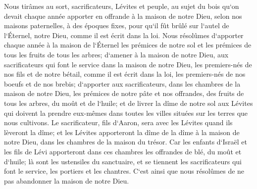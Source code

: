 \verse Nous tirâmes au sort, sacrificateurs, Lévites et peuple, au sujet du bois qu`on devait chaque année apporter en offrande à la maison de notre Dieu, selon nos maisons paternelles, à des époques fixes, pour qu`il fût brûlé sur l`autel de l`Éternel, notre Dieu, comme il est écrit dans la loi. 
\verse Nous résolûmes d`apporter chaque année à la maison de l`Éternel les prémices de notre sol et les prémices de tous les fruits de tous les arbres; 
\verse d`amener à la maison de notre Dieu, aux sacrificateurs qui font le service dans la maison de notre Dieu, les premiers-nés de nos fils et de notre bétail, comme il est écrit dans la loi, les premiers-nés de nos boeufs et de nos brebis; 
\verse d`apporter aux sacrificateurs, dans les chambres de la maison de notre Dieu, les prémices de notre pâte et nos offrandes, des fruits de tous les arbres, du moût et de l`huile; et de livrer la dîme de notre sol aux Lévites qui doivent la prendre eux-mêmes dans toutes les villes situées sur les terres que nous cultivons. 
\verse Le sacrificateur, fils d`Aaron, sera avec les Lévites quand ils lèveront la dîme; et les Lévites apporteront la dîme de la dîme à la maison de notre Dieu, dans les chambres de la maison du trésor. 
\verse Car les enfants d`Israël et les fils de Lévi apporteront dans ces chambres les offrandes de blé, du moût et d`huile; là sont les ustensiles du sanctuaire, et se tiennent les sacrificateurs qui font le service, les portiers et les chantres. C`est ainsi que nous résolûmes de ne pas abandonner la maison de notre Dieu. 

\chapter{}

